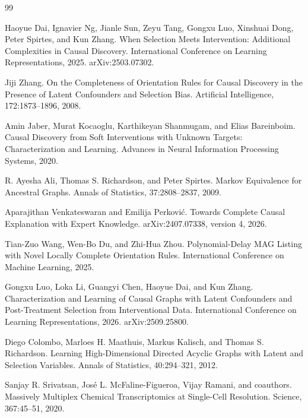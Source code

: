 \documentclass{article}
\begin{document}
\begin{thebibliography}{99}

   Haoyue Dai, Ignavier Ng, Jianle Sun, Zeyu Tang, Gongxu Luo, Xinshuai Dong, Peter Spirtes, and Kun Zhang. When Selection Meets Intervention: Additional Complexities in Causal Discovery. International Conference on Learning Representations, 2025. arXiv:2503.07302.

   Jiji Zhang. On the Completeness of Orientation Rules for Causal Discovery in the Presence of Latent Confounders and Selection Bias. Artificial Intelligence, 172:1873--1896, 2008.

   Amin Jaber, Murat Kocaoglu, Karthikeyan Shanmugam, and Elias Bareinboim. Causal Discovery from Soft Interventions with Unknown Targets: Characterization and Learning. Advances in Neural Information Processing Systems, 2020.

   R. Ayesha Ali, Thomas S. Richardson, and Peter Spirtes. Markov Equivalence for Ancestral Graphs. Annals of Statistics, 37:2808--2837, 2009.

   Aparajithan Venkateswaran and Emilija Perkovi\'c. Towards Complete Causal Explanation with Expert Knowledge. arXiv:2407.07338, version 4, 2026.

   Tian-Zuo Wang, Wen-Bo Du, and Zhi-Hua Zhou. Polynomial-Delay MAG Listing with Novel Locally Complete Orientation Rules. International Conference on Machine Learning, 2025.

   Gongxu Luo, Loka Li, Guangyi Chen, Haoyue Dai, and Kun Zhang. Characterization and Learning of Causal Graphs with Latent Confounders and Post-Treatment Selection from Interventional Data. International Conference on Learning Representations, 2026. arXiv:2509.25800.

   Diego Colombo, Marloes H. Maathuis, Markus Kalisch, and Thomas S. Richardson. Learning High-Dimensional Directed Acyclic Graphs with Latent and Selection Variables. Annals of Statistics, 40:294--321, 2012.

   Sanjay R. Srivatsan, Jos\'e L. McFaline-Figueroa, Vijay Ramani, and coauthors. Massively Multiplex Chemical Transcriptomics at Single-Cell Resolution. Science, 367:45--51, 2020.

\end{thebibliography}
\end{document}
